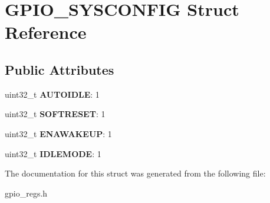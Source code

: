 \hypertarget{structGPIO__SYSCONFIG}{\section{G\-P\-I\-O\-\_\-\-S\-Y\-S\-C\-O\-N\-F\-I\-G Struct Reference}
\label{structGPIO__SYSCONFIG}
}
\subsection*{Public Attributes}
\begin{DoxyCompactItemize}
\item 
\hypertarget{structGPIO__SYSCONFIG_a0a0920956d0ebc848efe412580e57e38}{uint32\-\_\-t {\bfseries A\-U\-T\-O\-I\-D\-L\-E}\-: 1}\label{structGPIO__SYSCONFIG_a0a0920956d0ebc848efe412580e57e38}

\item 
\hypertarget{structGPIO__SYSCONFIG_ad5d7204e77ebd9e8db39866b363710de}{uint32\-\_\-t {\bfseries S\-O\-F\-T\-R\-E\-S\-E\-T}\-: 1}\label{structGPIO__SYSCONFIG_ad5d7204e77ebd9e8db39866b363710de}

\item 
\hypertarget{structGPIO__SYSCONFIG_aa8f6eb44b9b341ebafe942d9872e6d8e}{uint32\-\_\-t {\bfseries E\-N\-A\-W\-A\-K\-E\-U\-P}\-: 1}\label{structGPIO__SYSCONFIG_aa8f6eb44b9b341ebafe942d9872e6d8e}

\item 
\hypertarget{structGPIO__SYSCONFIG_a9a12bf969320343b9992b1f6c880f3cf}{uint32\-\_\-t {\bfseries I\-D\-L\-E\-M\-O\-D\-E}\-: 1}\label{structGPIO__SYSCONFIG_a9a12bf969320343b9992b1f6c880f3cf}

\end{DoxyCompactItemize}


The documentation for this struct was generated from the following file\-:\begin{DoxyCompactItemize}
\item 
gpio\-\_\-regs.\-h\end{DoxyCompactItemize}
